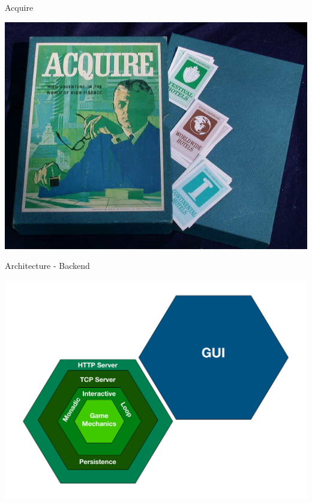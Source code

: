 \begin{frame}[fragile]{Acquire}
  \begin{center}
    \includegraphics[height=.8\textheight]{./images/acquire-boardgame.jpg}
  \end{center}
\end{frame}

\begin{frame}[fragile]{Architecture - Backend}
  \begin{center}
    \includegraphics[height=.8\textheight]{./images/archi-back.pdf}
  \end{center}
\end{frame}

